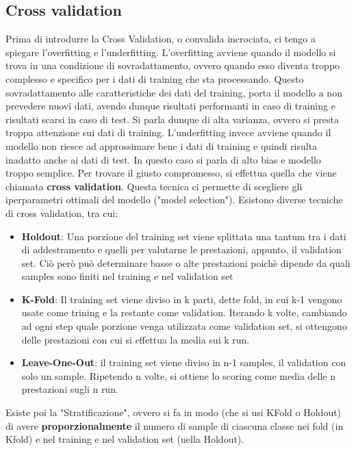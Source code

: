\subsection{Cross validation}

Prima di introdurre la Cross Validation, o convalida incrociata, ci tengo a spiegare l'overfitting e l'underfitting.
\newline L'overfitting avviene quando il modello si trova in una condizione di sovradattamento, ovvero quando esso diventa troppo complesso e specifico per i dati di training che sta processando. Questo sovradattamento alle caratteristiche dei dati del training, porta il modello a non prevedere nuovi dati, avendo dunque risultati performanti in caso di training e risultati scarsi in caso di test. Si parla dunque di alta varianza, ovvero si presta troppa attenzione sui dati di training.
\newline L'underfitting invece avviene quando il modello non riesce ad approssimare bene i dati di training e quindi risulta inadatto anche ai dati di test. In questo caso si parla di alto bias e modello troppo semplice. 
\newline Per trovare il giusto compromesso, si effettua quella che viene chiamata \textbf{cross validation}. Questa tecnica ci permette di scegliere gli iperparametri ottimali del modello ("model selection").
Esistono diverse tecniche di cross validation, tra cui:
\begin{itemize}
    \item \textbf{Holdout}: Una porzione del training set viene splittata una tantum tra i dati di addestramento e quelli per valutarne le prestazioni, appunto, il validation set. Ciò però può determinare basse o alte prestazioni poichè dipende da quali samples sono finiti nel training e nel validation set
    \item \textbf{K-Fold}: Il training set viene diviso in k parti, dette fold, in cui k-1 vengono usate come trining e la restante come validation. Iterando k volte, cambiando ad ogni step quale porzione venga utilizzata come validation set, si ottengono delle prestazioni con cui si effettua la media sui k run.
    \item \textbf{Leave-One-Out}: il training set viene diviso in n-1 samples, il validation con solo un sample. Ripetendo n volte, si ottiene lo scoring come media delle n prestazioni sugli n run.
\end{itemize}
Esiste poi la "Stratificazione", ovvero si fa in modo (che si usi KFold o Holdout) di avere \textbf{proporzionalmente} il numero di sample di ciascuna classe nei fold (in Kfold) e nel training e nel validation set (nella Holdout).
